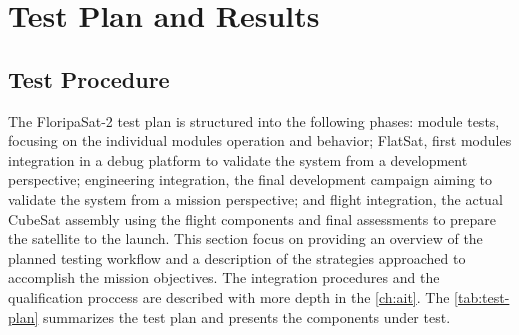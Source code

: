 %
%
%
%
%

%
%
%
%
%
%

\chapter{Test Plan and Results} \label{ch:test-plan}

\section{Test Procedure}

The FloripaSat-2 test plan is structured into the following phases: module tests, focusing on the individual modules operation and behavior; FlatSat, first modules integration in a debug platform to validate the system from a development perspective; engineering integration, the final development campaign aiming to validate the system from a mission perspective; and flight integration, the actual CubeSat assembly using the flight components and final assessments to prepare the satellite to the launch. This section focus on providing an overview of the planned testing workflow and a description of the strategies approached to accomplish the mission objectives. The integration procedures and the qualification proccess are described with more depth in the \autoref{ch:ait}. The \autoref{tab:test-plan} summarizes the test plan and presents the components under test. 

